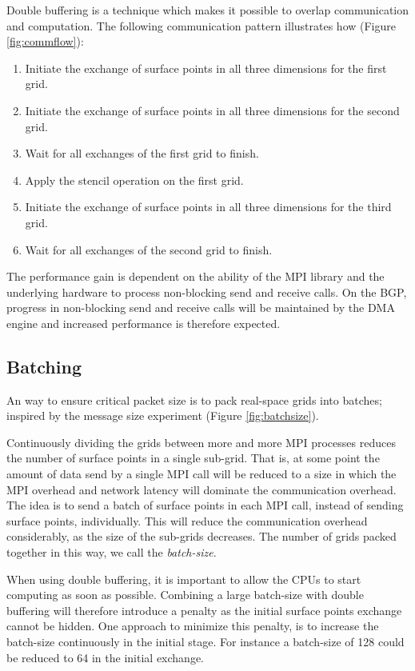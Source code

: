\documentclass[conference]{IEEEtran}
\begin{document}
Double buffering is a technique which makes it possible to overlap communication and computation. The following communication pattern illustrates how (Figure \ref{fig:commflow}):
\begin{enumerate}
 \item Initiate the exchange of surface points in all three dimensions for the first grid.
 \item Initiate the exchange of surface points in all three dimensions for the second grid.
 \item Wait for all exchanges of the first grid to finish.
 \item Apply the stencil operation on the first grid.
 \item Initiate the exchange of surface points in all three dimensions for the third grid.
 \item Wait for all exchanges of the second grid to finish.
\end{enumerate}
The performance gain is dependent on the ability of the MPI library and the underlying hardware to process non-blocking send and receive calls. On the BGP, progress in non-blocking send and receive calls will be maintained by the DMA engine and increased performance is therefore expected.

\subsection*{Batching}
An way to ensure critical packet size is to pack real-space grids into batches; inspired by the message size experiment (Figure \ref{fig:batchsize}).

Continuously dividing the grids between more and more MPI processes reduces the number of surface points in a single sub-grid. That is, at some point the amount of data send by a single MPI call will be reduced to a size in which the MPI overhead and network latency will dominate the communication overhead. The idea is to send a batch of surface points in each MPI call, instead of sending surface points, individually. This will reduce the communication overhead considerably, as the size of the sub-grids decreases. The number of grids packed together in this way, we call the \emph{batch-size}.

When using double buffering, it is important to allow the CPUs to start computing as soon as possible. Combining a large batch-size with double buffering will therefore introduce a penalty as the initial surface points exchange cannot be hidden. One approach to minimize this penalty, is to increase the batch-size continuously in the initial stage. For instance a batch-size of 128 could be reduced to 64 in the initial exchange.
\end{document}
